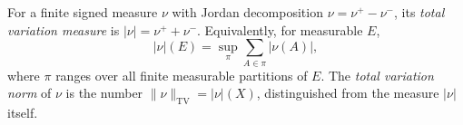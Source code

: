 
For a finite signed measure $\nu$ with Jordan decomposition $\nu=\nu^+-\nu^-$, its \emph{total variation measure} is $|\nu|=\nu^++\nu^-$. Equivalently, for measurable $E$,
\[
|\nu|(E)=\sup_{\pi}\sum_{A\in\pi}|\nu(A)|,
\]
where $\pi$ ranges over all finite measurable partitions of $E$. The \emph{total variation norm} of $\nu$ is the number $\|\nu\|_{\mathrm{TV}}=|\nu|(X)$, distinguished from the measure $|\nu|$ itself.
